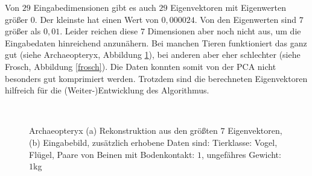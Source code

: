 Von $29$ Eingabedimensionen gibt es auch $29$ Eigenvektoren mit Eigenwerten größer $0$. Der kleinste hat einen Wert von $0,000024$. Von den Eigenwerten sind $7$ größer als $0,01$. Leider reichen diese $7$ Dimensionen aber noch nicht aus, um die Eingabedaten hinreichend anzunähern. Bei manchen Tieren funktioniert das ganz gut (siehe Archaeopteryx, Abbildung \ref{archaeopteryx}), bei anderen aber eher schlechter (siehe Frosch, Abbildung \ref{frosch}). Die Daten konnten somit von der PCA nicht besonders gut komprimiert werden. Trotzdem sind die berechneten Eigenvektoren hilfreich für die (Weiter-)Entwicklung des Algorithmus. 
 
 \begin{figure}
  \centering
  \\
  
  \caption{Archaeopteryx (a) Rekonstruktion aus den größten $7$ Eigenvektoren, (b) Eingabebild, zusätzlich erhobene Daten sind:
  Tierklasse: Vogel, Flügel, Paare von Beinen mit Bodenkontakt: $1$, ungefähres Gewicht: $1$kg}
  \label{archaeopteryx}
 \end{figure}
 
